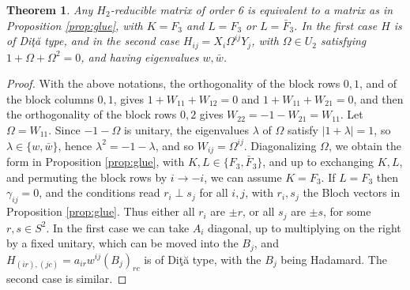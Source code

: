 \documentclass[11pt]{amsart}
\newtheorem{theorem}{Theorem}[section]
\begin{document}
\begin{theorem}\label{thm:karlsson}
Any $H_2$-reducible matrix of order 6 is equivalent to a matrix as in Proposition \ref{prop:glue}, with $K=F_3$ and $L=F_3$ or $L=\bar{F}_3$. In the first case $H$ is of Di\c t\u a type, and in the second case $H_{ij}=X_i\Omega^{ij}Y_j$, with $\Omega\in U_2$ satisfying $1+\Omega+\Omega^2=0$, and having eigenvalues $w,\bar{w}$.
\end{theorem}

\begin{proof}
With the above notations, the orthogonality of the block rows $0,1$, and of the block columns $0,1$, gives $1+W_{11}+W_{12}=0$ and $1+W_{11}+W_{21}=0$, and then the orthogonality of the block rows $0,2$ gives $W_{22}=-1-W_{21}=W_{11}$. Let $\Omega=W_{11}$. Since $-1-\Omega$ is unitary, the eigenvalues $\lambda$ of $\Omega$ satisfy $|1+\lambda|=1$, so $\lambda\in\{w,\bar{w}\}$, hence $\lambda^2=-1-\lambda$, and so $W_{ij}=\Omega^{ij}$. Diagonalizing $\Omega$, we obtain the form in Proposition \ref{prop:glue}, with $K,L\in\{F_3,\bar{F}_3\}$, and up to exchanging $K,L$, and permuting the block rows by $i\to-i$, we can assume $K=F_3$. If $L=F_3$ then $\gamma_{ij}=0$, and the conditions read $r_i\perp s_j$ for all $i,j$, with $r_i,s_j$ the Bloch vectors in Proposition \ref{prop:glue}. Thus either all $r_i$ are $\pm r$, or all $s_j$ are $\pm s$, for some $r,s\in S^2$. In the first case we can take $A_i$ diagonal, up to multiplying on the right by a fixed unitary, which can be moved into the $B_j$, and $H_{(ir),(jc)}=a_{ir}w^{ij}(B_j)_{rc}$ is of Di\c t\u a type, with the $B_j$ being Hadamard. The second case is similar.
\end{proof}
\end{document}
